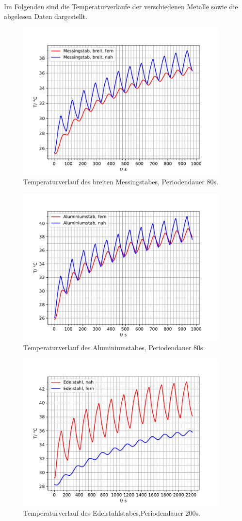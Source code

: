 Im Folgenden sind die Temperaturverläufe der verschiedenen Metalle sowie die abgelesen
Daten dargestellt.
\begin{figure}[H]
  \centering
  \includegraphics[height=8cm]{T12.pdf}
  \caption{Temperaturverlauf des breiten Messingstabes, Periodendauer 80s.}
  \label{fig:T12}
\end{figure}
\begin{figure}[H]
  \centering
  \includegraphics[height=8cm]{T56.pdf}
  \caption{Temperaturverlauf des Aluminiumstabes, Periodendauer 80s.}
  \label{fig:T56}
\end{figure}
\begin{figure}[H]
  \centering
  \includegraphics[height=8cm]{T78.pdf}
  \caption{Temperaturverlauf des Edelstahlstabes,Periodendauer 200s.}
  \label{fig:T78}
\end{figure}

